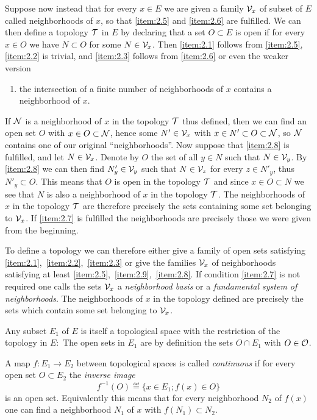 Suppose now instead that for every $x\in E$ we are given a family
$\mathcal{V}_x$ of subset of $E$ called neighborhoods of $x$, so that
\ref{item:2.5} and \ref{item:2.6} are fulfilled. We can then define a
topology $\mathcal{T}$ in $E$ by declaring that a set $O\subset E$ is open if
for every $x\in O$ we have $N\subset O$ for some $N\in\mathcal{V}_x$. Then
\ref{item:2.1} follows from \ref{item:2.5}, \ref{item:2.2} is trivial,
and \ref{item:2.3} follows from \ref{item:2.6} or even the weaker
version
\begin{enumerate}[label=\roman*)$'$,start=2]
\item\label{item:2.9} the intersection of a finite number of
  neighborhoods of $x$ contains a neighborhood of $x$.
\end{enumerate}
If $\mathcal{N}$ is a neighborhood of $x$ in the topology $\mathcal{T}$ thus defined,
then we can find an open set $O$ with $x\in O\subset\mathcal{N}$, hence some
$N'\in\mathcal{V}_x$ with $x\in N'\subset O\subset\mathcal{N}$, so $\mathcal{N}$ contains one of
our original ``neighborhoods''. Now suppose that \ref{item:2.8} is
fulfilled, and let $N\in\mathcal{V}_x$. Denote by $O$ the set of all $y\in N$
such that $N\in\mathcal{V}_y$. By \ref{item:2.8} we can then find $N_y'\in\mathcal{V}_y$
such that $N\in\mathcal{V}_z$ for every $z\in N'_y$, thus $N'_y\subset O$. This
means that $O$ is open in the topology $\mathcal{T}$ and since $x\in O\subset
N$ we see that $N$ is also a neighborhood of $x$ in the topology
$\mathcal{T}$. The neighborhoods of $x$ in the topology $\mathcal{T}$ are therefore
precisely the sets containing some set belonging to $\mathcal{V}_x$. If
\ref{item:2.7} is fulfilled the neighborhoods are precisely those we
were given from the beginning.

To define a topology we can therefore either give a family of open
sets satisfying \ref{item:2.1},~\ref{item:2.2},~\ref{item:2.3} or give
the families $\mathcal{V}_x$ of neighborhoods satisfying at least
\ref{item:2.5},~\ref{item:2.9},~\ref{item:2.8}. If condition
\ref{item:2.7} is not required one calls the sets $\mathcal{V}_x$ a
\emph{neighborhood basis} or a \emph{fundamental system of
  neighborhoods}. The neighborhoods of $x$ in the topology defined are
precisely the sets which contain some set belonging to $\mathcal{V}_x$.

Any subset $E_1$ of $E$ is itself a topological space with the
restriction of the topology in $E:$ The open sets in $E_1$ are by
definition the sets $O\cap E_1$ with $O\in\mathcal{O}$.

A map $f:E_1\to E_2$ between topological spaces is called
\emph{continuous} if for every open set $O\subset E_2$ the
\emph{inverse image}
\begin{displaymath}
  f^{-1}(O)\eqdef\{x\in E_1; f(x)\in O\}
\end{displaymath}
is an open set. Equivalently this means that for every neighborhood
$N_2$ of $f(x)$ one can find a neighborhood $N_1$ of $x$ with
$f(N_1)\subset N_2$.

